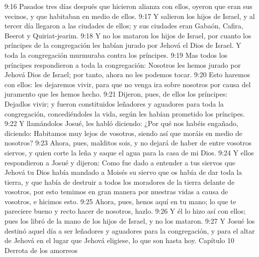 9:16 Pasados tres días después que hicieron alianza con ellos, oyeron que eran sus vecinos, y que habitaban en medio de ellos.  
9:17 Y salieron los hijos de Israel, y al tercer día llegaron a las ciudades de ellos; y sus ciudades eran Gabaón, Cafira, Beerot y Quiriat-jearim.  
9:18 Y no los mataron los hijos de Israel, por cuanto los príncipes de la congregación les habían jurado por Jehová el Dios de Israel. Y toda la congregación murmuraba contra los príncipes.  
9:19 Mas todos los príncipes respondieron a toda la congregación: Nosotros les hemos jurado por Jehová Dios de Israel; por tanto, ahora no les podemos tocar.  
9:20 Esto haremos con ellos: les dejaremos vivir, para que no venga ira sobre nosotros por causa del juramento que les hemos hecho.  
9:21 Dijeron, pues, de ellos los príncipes: Dejadlos vivir; y fueron constituidos leñadores y aguadores para toda la congregación, concediéndoles la vida, según les habían prometido los príncipes.  
9:22 Y llamándolos Josué, les habló diciendo: ¿Por qué nos habéis engañado, diciendo: Habitamos muy lejos de vosotros, siendo así que moráis en medio de nosotros?  
9:23 Ahora, pues, malditos sois, y no dejará de haber de entre vosotros siervos, y quien corte la leña y saque el agua para la casa de mi Dios.  
9:24 Y ellos respondieron a Josué y dijeron: Como fue dado a entender a tus siervos que Jehová tu Dios había mandado a Moisés su siervo que os había de dar toda la tierra, y que había de destruir a todos los moradores de la tierra delante de vosotros, por esto temimos en gran manera por nuestras vidas a causa de vosotros, e hicimos esto.  
9:25 Ahora, pues, henos aquí en tu mano; lo que te pareciere bueno y recto hacer de nosotros, hazlo.  
9:26 Y él lo hizo así con ellos; pues los libró de la mano de los hijos de Israel, y no los mataron.  
9:27 Y Josué los destinó aquel día a ser leñadores y aguadores para la congregación, y para el altar de Jehová en el lugar que Jehová eligiese, lo que son hasta hoy.  
Capítulo 10
Derrota de los amorreos  

